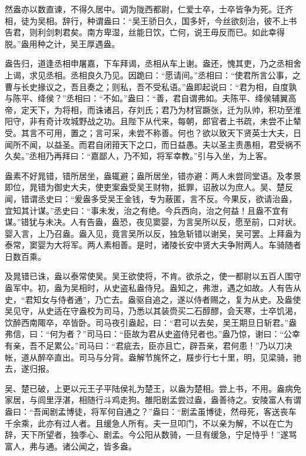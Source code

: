 \documentclass[12pt,UTF8]{ctexbook}
\begin{document}
然盎亦以数直谏，不得久居中。调为陇西都尉，仁爱士卒，士卒皆争为死。迁齐相，徒为吴相。辞行，种谓盎曰：“吴王骄日久，国多奸，今丝欲刻治，彼不上书告君，则利剑刺君矣。南方卑湿，丝能日饮，亡何，说王毋反而已。如此幸得脱。”盎用种之计，吴王厚遇盎。



盎告归，道逢丞相申屠嘉，下车拜谒，丞相从车上谢。盎还，愧其吏，乃之丞相舍上谒，求见丞相。丞相良久乃见。因跪曰：“愿请间。”丞相曰：“使君所言公事，之曹与长史掾议之，吾且奏之；则私，吾不受私语。”盎即起说曰：“君为相，自度孰与陈平、绛侯？”丞相曰：“不如。”盎曰：“善，君自谓弗如。夫陈平、绛侯辅翼高帝，定天下，为将相，而诛诸吕，存刘氏；君乃为材官蹶张，迁为队帅，积功至淮阳守，非有奇计攻城野战之功。且陛下从代来，每朝，郎官者上书疏，未尝不止辇受。其言不可用，置之；言可采，未尝不称善。何也？欲以致天下贤英士大夫，日闻所不闻，以益圣。而君自闭箝天下之口，而日益愚。夫以圣主责愚相，君受祸不久矣。”丞相乃再拜曰：“嘉鄙人，乃不知，将军幸教。”引与入坐，为上客。



盎素不好晁错，错所居坐，盎辄避；盎所居坐，错亦避：两人未尝同堂语。及孝景即位，晁错为御史大夫，使吏案盎受吴王财物，抵罪，诏赦以为庶人。吴、楚反闻，错谓丞史曰：“爰盎多受吴王金钱，专为蔽匿，言不反。今果反，欲请治盎，宜知其计谋。”丞史曰：“事未发，治之有绝。今兵西向，治之何益！且盎不宜有谋。”错犹与未决。人有告盎，盎恐，夜见窦婴，为言吴所以反，愿至前，口对状。婴入言，上乃召盎。盎入见，竟言吴所以反，独急斩错以谢吴，吴可罢。上拜盎为泰常，窦婴为大将军。两人素相善。是时，诸陵长安中贤大夫争附两人。车骑随者日数百乘。



及晁错已诛，盎以泰常使吴。吴王欲使将，不肯。欲杀之，使一都尉以五百人围守盎军中。初，盎为吴相时，从史盗私盎侍兒。盎知之，弗泄，遇之如故。人有告从史，“君知女与侍者通”，乃亡去。盎驱自追之，遂以侍者赐之，复为从史。及盎使吴见守，从史适在守盎校为司马，乃悉以其装赍买二石醇醪，会天寒，士卒饥渴，饮醉西南陬卒，卒皆卧。司马夜引盎起，曰：“君可以去矣，吴王期旦日斩君。”盎弗信，曰：“何为者？”司马曰：“臣故为君从史盗侍兒者也。”盎乃惊，谢曰：“公幸有亲，吾不足累公。”司马曰：“君疵去，臣亦且亡，辟吾亲，君何患！”乃以刀决帐，道从醉卒直出。司马与分背。盎解节旄怀之，屐步行七十里，明，见梁骑，驰去，遂归报。



吴、楚已破，上更以元王子平陆侯礼为楚王，以盎为楚相。尝上书，不用。盎病免家居，与闾里浮湛，相随行斗鸡走狗。雒阳剧孟尝过盎，盎善待之。安陵富人有谓盎曰：“吾闻剧孟博徒，将军何自通之？”盎曰：“剧孟虽博徒，然母死，客送丧车千余乘，此亦有过人者。且缓急人所有。夫一旦叩门，不以亲为解，不以在亡为辞，天下所望者，独季心、剧孟。今公阳从数骑，一旦有缓急，宁足恃乎！”遂骂富人，弗与通。诸公闻之，皆多盎。
\end{document}
